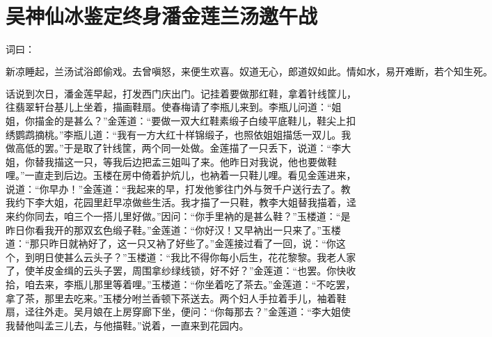 

\chapter{吴神仙冰鉴定终身\KG 潘金莲兰汤邀午战}


词曰：

\[
新凉睡起，兰汤试浴郎偷戏。去曾嗔怒，来便生欢喜。奴道无心，郎道奴如此。情如水，易开难断，若个知生死。
\]

话说到次日，潘金莲早起，打发西门庆出门。记挂着要做那红鞋，拿着针线筐儿，往翡翠轩台基儿上坐着，描画鞋扇。使春梅请了李瓶儿来到。李瓶儿问道：“姐姐，你描金的是甚么？”金莲道：“要做一双大红鞋素缎子白绫平底鞋儿，鞋尖上扣绣鹦鹉摘桃。”李瓶儿道：“我有一方大红十样锦缎子，也照依姐姐描恁一双儿。我做高低的罢。”于是取了针线筐，两个同一处做。金莲描了一只丢下，说道：“李大姐，你替我描这一只，等我后边把孟三姐叫了来。他昨日对我说，他也要做鞋哩。”一直走到后边。玉楼在房中倚着护炕儿，也衲着一只鞋儿哩。看见金莲进来，说道：“你早办！”金莲道：“我起来的早，打发他爹往门外与贺千户送行去了。教我约下李大姐，花园里赶早凉做些生活。我才描了一只鞋，教李大姐替我描着，迳来约你同去，咱三个一搭儿里好做。”因问：“你手里衲的是甚么鞋？”玉楼道：“是昨日你看我开的那双玄色缎子鞋。”金莲道：“你好汉！又早衲出一只来了。”玉楼道：“那只昨日就衲好了，这一只又衲了好些了。”金莲接过看了一回，说：“你这个，到明日使甚么云头子？”玉楼道：“我比不得你每小后生，花花黎黎。我老人家了，使羊皮金缉的云头子罢，周围拿纱绿线锁，好不好？”金莲道：“也罢。你快收拾，咱去来，李瓶儿那里等着哩。”玉楼道：“你坐着吃了茶去。”金莲道：“不吃罢，拿了茶，那里去吃来。”玉楼分咐兰香顿下茶送去。两个妇人手拉着手儿，袖着鞋扇，迳往外走。吴月娘在上房穿廊下坐，便问：“你每那去？”金莲道：“李大姐使我替他叫孟三儿去，与他描鞋。”说着，一直来到花园内。

